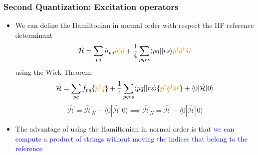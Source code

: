 \documentclass{beamer}
\begin{document}
\begin{frame}
\frametitle{Second Quantization: Excitation operators}

\begin{itemize}
\item  We can define the Hamiltonian  in normal order with respect the HF reference determinant 
 \[
\hat{\mathcal{H}}=\sum_{pq}h_{pq}\textcolor{orange}{ \hat{p}^{\dagger}\hat{q}}+\frac{1}{4}\sum_{pqrs} \langle pq || rs \rangle \textcolor{orange}{ \hat{p}^{\dagger}\hat{q}^{\dagger}\hat{s}\hat{r}}
\]
using the Wick Theorem:
 \[
\hat{\mathcal{H}}=\sum_{pq}f_{pq} \{\textcolor{orange}{ \hat{p}^{\dagger}\hat{q}} \}+\frac{1}{4} \sum_{pqrs} \langle pq || rs \rangle  \{ \textcolor{orange}{ \hat{p}^{\dagger}\hat{q}^{\dagger}\hat{s}\hat{r}} \}+ \langle 0 |\hat{\mathcal{H}}|0 \rangle 
\]
 \[
\hat{\mathcal{H}}=\hat{\mathcal{H}}_{N}+ \langle 0 |\hat{\mathcal{H}}|0 \rangle  \implies  \hat{\mathcal{H}}_{N}= \hat{\mathcal{H}} - \langle 0 |\hat{\mathcal{H}}|0 \rangle 
\]

\item The advantage of using the Hamiltonian in normal order is that \textcolor{blue}{ we can compute a product of strings without moving the indices that belong to the reference}
\end{itemize}

\end{frame}
\end{document}
